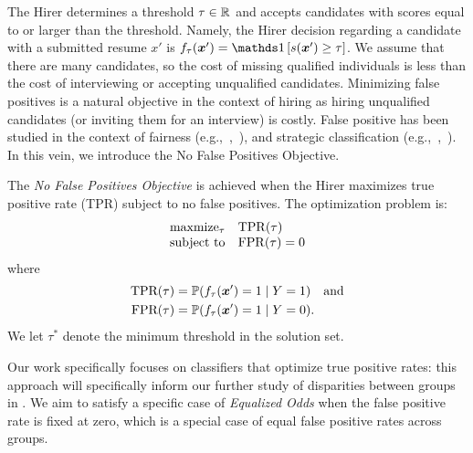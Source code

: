     The Hirer determines a threshold $\tau\in \mathbb{R}$ and accepts candidates with scores equal to or larger than the threshold. Namely, the Hirer decision regarding a candidate with a submitted resume $x'$ is \(f_\tau(\bm{x}') = \one[s(\bm{x}') \geq \tau]\). We assume that there are many candidates, so the cost of missing qualified individuals is less than the cost of interviewing or accepting unqualified candidates. Minimizing false positives is a natural objective in the context of hiring as hiring unqualified candidates (or inviting them for an interview) is costly. False positive has been studied in the context of fairness (e.g.,~\citet{cohen_et_al:LIPIcs.FORC.2020.1},~\citet{Blum22}), and strategic classification (e.g.,~\citet{AhmadiBBN22},~\citet{shao2023strategic}). In this vein, we introduce the No False Positives Objective. 

    \begin{definition}
        \label{def: no false positives objective}
        The \textit{No False Positives Objective} is achieved when the Hirer maximizes true positive rate (TPR) subject to no false positives. The optimization problem is: 
        \begin{align*}
        \begin{array}{ll}
        \mbox{maxmize}_{\tau}  & \mathrm{TPR}(\tau) \\
        \mbox{subject to} & \mathrm{FPR}(\tau) = 0
        \end{array}
        \end{align*}
        where        
        \begin{align*}
            \textrm{TPR}(\tau) &= \operatorname*{\mathbb{P}}(f_\tau(\bm{x}') = 1 \mid Y = 1)\quad \text{and} \\
            \textrm{FPR}(\tau) &= \operatorname*{\mathbb{P}}(f_\tau(\bm{x}') = 1 \mid Y = 0).
        \end{align*}  
        We let \(\tau^*\) denote the minimum threshold in the solution set.
    \end{definition}
    Our work specifically focuses on classifiers that optimize true positive rates: this approach will specifically inform our further study of disparities between groups in . We aim to satisfy a specific case of \textit{Equalized Odds} \citep{hardt2016equality} when the false positive rate is fixed at zero, which is a special case of equal false positive rates across groups. 
    
